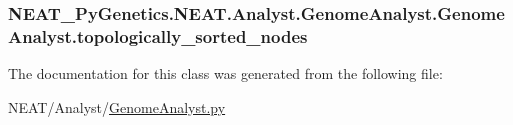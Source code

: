 \subsubsection[{\texorpdfstring{topologically\+\_\+sorted\+\_\+nodes}{topologically_sorted_nodes}}]{\setlength{\rightskip}{0pt plus 5cm}N\+E\+A\+T\+\_\+\+Py\+Genetics.\+N\+E\+A\+T.\+Analyst.\+Genome\+Analyst.\+Genome\+Analyst.\+topologically\+\_\+sorted\+\_\+nodes\hspace{0.3cm}{\ttfamily [static]}}\hypertarget{classNEAT__PyGenetics_1_1NEAT_1_1Analyst_1_1GenomeAnalyst_1_1GenomeAnalyst_a61333814f998f2c80d271f3ebc92d198}{}\label{classNEAT__PyGenetics_1_1NEAT_1_1Analyst_1_1GenomeAnalyst_1_1GenomeAnalyst_a61333814f998f2c80d271f3ebc92d198}


The documentation for this class was generated from the following file\+:\begin{DoxyCompactItemize}
\item 
N\+E\+A\+T/\+Analyst/\hyperlink{GenomeAnalyst_8py}{Genome\+Analyst.\+py}\end{DoxyCompactItemize}
